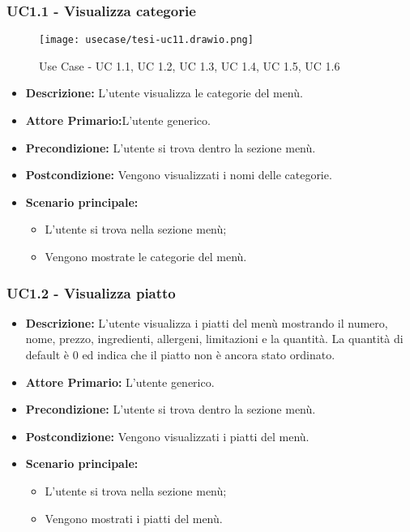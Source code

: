 \subsubsection{UC1.1 - Visualizza categorie}
\begin{figure}[H]
    \centering
    \texttt{[image: usecase/tesi-uc11.drawio.png]}
    \caption{Use Case - UC 1.1, UC 1.2, UC 1.3, UC 1.4, UC 1.5, UC 1.6}
\end{figure}
\begin{itemize}
    \item \textbf{Descrizione:} L'utente visualizza le categorie del menù.
    \item \textbf{Attore Primario:}L'utente generico.
    \item \textbf{Precondizione:} L'utente si trova dentro la sezione menù.
    \item \textbf{Postcondizione:} Vengono visualizzati i nomi delle categorie.
    \item \textbf{Scenario principale:}
    \begin{itemize}
        \item L'utente si trova nella sezione menù;
        \item Vengono mostrate le categorie del menù.
    \end{itemize}
\end{itemize}
\subsubsection{UC1.2 - Visualizza piatto}
\begin{itemize}
    \item \textbf{Descrizione:} L'utente visualizza i piatti del menù mostrando il numero, nome, prezzo, ingredienti, allergeni, limitazioni e la quantità. La quantità di default è 0 ed indica che il piatto non è ancora stato ordinato.
    \item \textbf{Attore Primario:} L'utente generico.
    \item \textbf{Precondizione:} L'utente si trova dentro la sezione menù.
    \item \textbf{Postcondizione:} Vengono visualizzati i piatti del menù.
    \item \textbf{Scenario principale:}  
    \begin{itemize}
        \item L'utente si trova nella sezione menù;
        \item Vengono mostrati i piatti del menù.
    \end{itemize}
\end{itemize}
